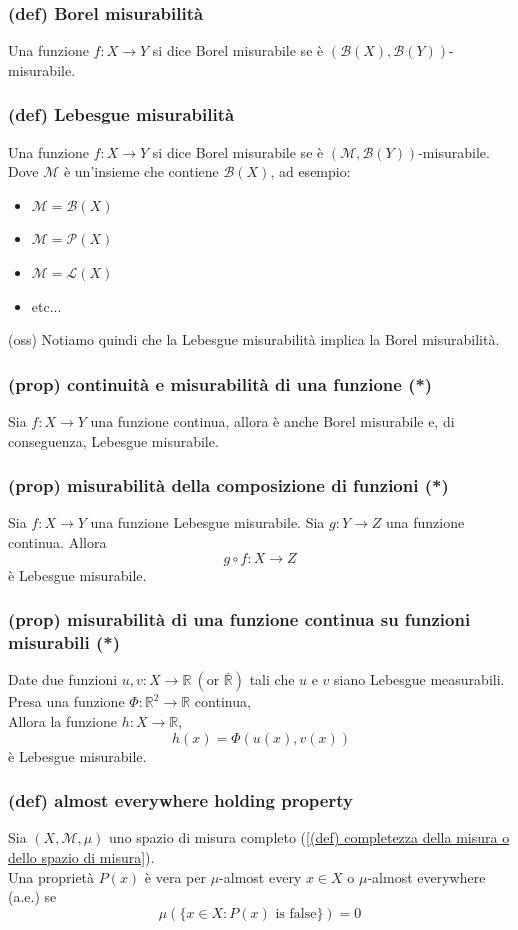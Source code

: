 \subsubsection{(def) Borel misurabilità}
Una funzione $f:X\to Y$ si dice Borel misurabile se è $(\mathcal B(X),\mathcal B(Y))$-misurabile.
\subsubsection{(def) Lebesgue misurabilità}
Una funzione $f:X\to Y$ si dice Borel misurabile se è $(\mathcal M,\mathcal B(Y))$-misurabile.\\
Dove $\mathcal M$ è un'insieme che contiene $\mathcal B(X)$, ad esempio:
\begin{itemize}
    \item $\mathcal M=\mathcal B(X)$
    \item $\mathcal M=\mathcal P(X)$
    \item $\mathcal M=\mathcal L(X)$
    \item etc...
\end{itemize}
(oss) Notiamo quindi che la Lebesgue misurabilità implica la Borel misurabilità.
\subsubsection{(prop) continuità e misurabilità di una funzione (*)}
Sia $f:X\to Y$ una funzione continua, allora è anche Borel misurabile e, di conseguenza, Lebesgue misurabile. 
\subsubsection{(prop) misurabilità della composizione di funzioni (*)}
Sia $f:X\to Y$ una funzione Lebesgue misurabile.
Sia $g:Y\to Z$ una funzione continua.
Allora
$$g\circ f:X\to Z$$ è Lebesgue misurabile.
\subsubsection{(prop) misurabilità di una funzione continua su funzioni misurabili (*) }
Date due funzioni $u,v:X\to \mathbb R\ (\text{or }\bar{\mathbb R}) $ tali che $u$ e $v$ siano Lebesgue measurabili.\\
Presa una funzione $\Phi:\mathbb R^2\to \mathbb R$ continua,\\
Allora la funzione $h:X\to \mathbb R$,$$\ h(x)=\Phi(u(x),v(x))$$ è Lebesgue misurabile.
\subsubsection{(def) almost everywhere holding property}
Sia $(X,\mathcal M, \mu)$ uno spazio di misura completo (\ref{(def) completezza della misura o dello spazio di misura}). \\
Una proprietà $P(x)$ è vera per $\mu$-almost every $x\in X$ o $\mu$-almost everywhere (a.e.) se
$$\mu(\{x\in X:P(x)\text{ is false}\})=0$$

